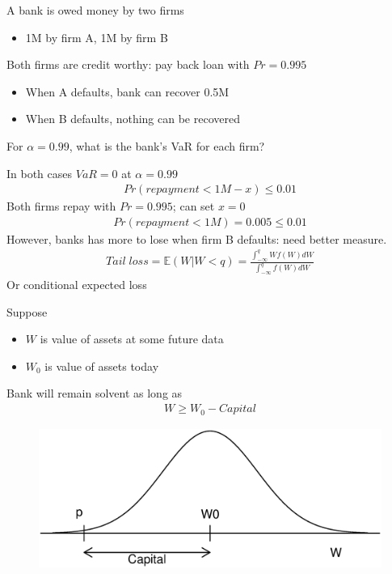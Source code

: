 \documentclass{beamer}
\begin{document}
\begin{frame} 
  A bank is owed money by two firms
  \begin{itemize}
    \item 1M by firm A, 1M by firm B
  \end{itemize}
  \medskip
  Both firms are credit worthy: pay back loan with $Pr=0.995$
  \begin{itemize}
    \item When A defaults, bank can recover 0.5M
    \item When B defaults, nothing can be recovered
  \end{itemize}  
  \medskip
  For $\alpha=0.99$, what is the bank's VaR for each firm?
\end{frame}


\begin{frame}
In both cases $VaR=0$ at $\alpha=0.99$
 \begin{align}
   Pr(repayment < 1M-x)\leq 0.01
 \end{align}
 \medskip
 Both firms repay with $Pr=0.995$; can set $x=0$
 \begin{align}
   Pr(repayment < 1M)=0.005 \leq 0.01
 \end{align}
 However, banks has more to lose when firm B defaults: need better measure. 
 \begin{align}
    Tail\;loss = \mathbb{E}(W|W<q) = \frac{\int^q_{-\infty}Wf(W)dW}{\int^q_{-\infty}f(W)dW}
  \end{align}
  \medskip
  Or conditional expected loss
\end{frame}

\begin{frame}
  Suppose 
  \begin{itemize}
    \item $W$ is value of assets at some future data
    \item $W_0$ is value of assets today
  \end{itemize}
  \medskip
  Bank will remain solvent as long as
  \begin{align}
    W\geq W_0 - Capital
  \end{align}
  \begin{figure}
    \includegraphics[scale=.3]{VaR2.eps}
  \end{figure}
\end{frame}
\end{document}
